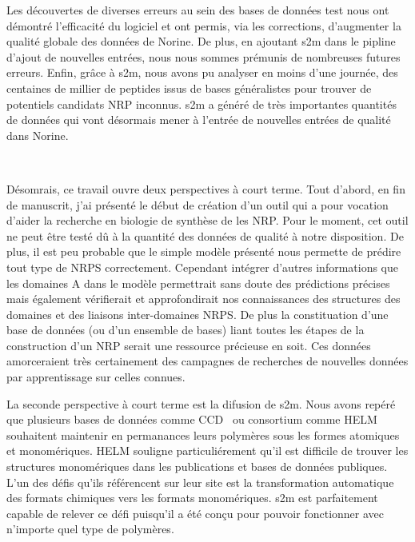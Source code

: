 Les découvertes de diverses erreurs au sein des bases de données test nous ont démontré l'efficacité du logiciel et ont permis, via les corrections, d'augmenter la qualité globale des données de Norine.
De plus, en ajoutant s2m dans le pipline d'ajout de nouvelles entrées, nous nous sommes prémunis de nombreuses futures erreurs.
Enfin, grâce à s2m, nous avons pu analyser en moins d'une journée, des centaines de millier de peptides issus de bases généralistes pour trouver de potentiels candidats NRP inconnus.
s2m a généré de très importantes quantités de données qui vont désormais mener à l'entrée de nouvelles entrées de qualité dans Norine.


~~


Désomrais, ce travail ouvre deux perspectives à court terme.
Tout d'abord, en fin de manuscrit, j'ai présenté le début de création d'un outil qui a pour vocation d'aider la recherche en biologie de synthèse de les NRP.
Pour le moment, cet outil ne peut être testé dû à la quantité des données de qualité à notre disposition.
De plus, il est peu probable que le simple modèle présenté nous permette de prédire tout type de NRPS correctement.
Cependant intégrer d'autres informations que les domaines A dans le modèle permettrait sans doute des prédictions précises mais également vérifierait et approfondirait nos connaissances des structures des domaines et des liaisons inter-domaines NRPS.
De plus la constituation d'une base de données (ou d'un ensemble de bases) liant toutes les étapes de la construction d'un NRP serait une ressource précieuse en soit.
Ces données amorceraient très certainement des campagnes de recherches de nouvelles données par apprentissage sur celles connues.

La seconde perspective à court terme est la difusion de s2m.
Nous avons repéré que plusieurs bases de données comme CCD~\cite{rahman_small_2009} ou consortium comme HELM~\cite{_helm_????} souhaitent maintenir en permanances leurs polymères sous les formes atomiques et monomériques.
HELM souligne particuliérement qu'il est difficile de trouver les structures monomériques dans les publications et bases de données publiques.
L'un des défis qu'ils référencent sur leur site est la transformation automatique des formats chimiques vers les formats monomériques.
s2m est parfaitement capable de relever ce défi puisqu'il a été conçu pour pouvoir fonctionner avec n'importe quel type de polymères.

